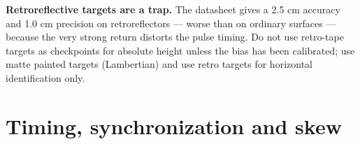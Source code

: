 \begin{tip}
\textbf{Retroreflective targets are a trap.} The datasheet gives a 2.5 cm accuracy and 1.0 cm precision on retroreflectors --- worse than on ordinary surfaces --- because the very strong return distorts the pulse timing. Do not use retro-tape targets as checkpoints for absolute height unless the bias has been calibrated; use matte painted targets (Lambertian) and use retro targets for horizontal identification only.
\end{tip}

\section{Timing, synchronization and skew}

